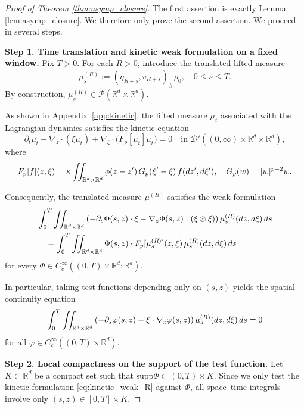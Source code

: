 \documentclass[10pt,a4paper]{amsart}
\newcommand{\R}{\mathbb R}
\newcommand{\calD}{\mathcal D}
\newcommand{\calP}{\mathcal P}
\newcommand{\intrr}{\iint_{\R^d \times \R^d}}
\renewcommand{\le}{\leqslant}
\newcommand{\lt}{\left}
\newcommand{\rd}{\textnormal{d}}
\newcommand{\rt}{\right}
\newcommand{\supp}{\text{supp}}
\begin{document}
\begin{proof}[Proof of Theorem \ref{thm:asymp_closure}]
The first assertion is exactly Lemma \ref{lem:asymp_closure}. We therefore only prove the second assertion. We proceed in several steps.

\medskip
\noindent\textbf{Step 1. Time translation and kinetic weak formulation on a fixed window.}
Fix $T>0$. For each $R>0$, introduce the translated lifted measure
\[
\mu^{(R)}_s := (\eta_{R+s},v_{R+s})_\#\rho_0, \quad 0\le s\le T.
\]
By construction, $\mu^{(R)}_s\in\calP(\R^d\times\R^d)$.

As shown in Appendix~\ref{app:kinetic}, the lifted measure $\mu_t$ associated with the Lagrangian dynamics satisfies the kinetic equation
\[
\partial_t\mu_t +\nabla_z\cdot(\xi\mu_t) +\nabla_\xi\cdot\bigl(F_p[\mu_t]\mu_t\bigr)=0 \quad\text{in }\calD'((0,\infty)\times\R^d\times\R^d),
\]
where
\[
F_p[f](z,\xi) = \kappa \iint_{\R^d\times\R^d} \phi(z-z')\,G_p(\xi'-\xi)\,f(\rd z',\rd\xi'),
\quad
G_p(w)=|w|^{p-2}w.
\]

Consequently, the translated measure $\mu^{(R)}$ satisfies the weak formulation
\begin{align}\label{eq:kinetic_weak_R}
\begin{aligned}
&\int_0^T\intrr \lt(-\partial_s\Phi(s,z)\cdot\xi -\nabla_z\Phi(s,z):(\xi\otimes\xi)\rt) \mu^{(R)}_s(\rd z,\rd\xi) \,\rd s \\ 
&\quad = \int_0^T\intrr \Phi(s,z)\cdot F_p[\mu^{(R)}_s](z,\xi) \,\mu^{(R)}_s(\rd z,\rd\xi) \,\rd s
\end{aligned}
\end{align}
for every $\Phi\in C_c^\infty((0,T)\times\R^d;\R^d)$.

In particular, taking test functions depending only on $(s,z)$ yields the spatial continuity equation
\[%
\int_0^T\intrr
\lt(-\partial_s\varphi(s,z)-\xi\cdot\nabla_z\varphi(s,z)\rt)  \mu^{(R)}_s(\rd z,\rd\xi)\,\rd s=0
\]%
for all $\varphi\in C_c^\infty((0,T)\times\R^d)$.
 
\medskip
\noindent\textbf{Step 2. Local compactness on the support of the test function.}
Let $K\subset\R^d$ be a compact set such that $\supp\Phi\subset (0,T)\times K$. Since we only test the kinetic formulation \eqref{eq:kinetic_weak_R} against $\Phi$, all space--time integrals involve only $(s,z)\in[0,T]\times K$.


\end{proof}
\end{document}
